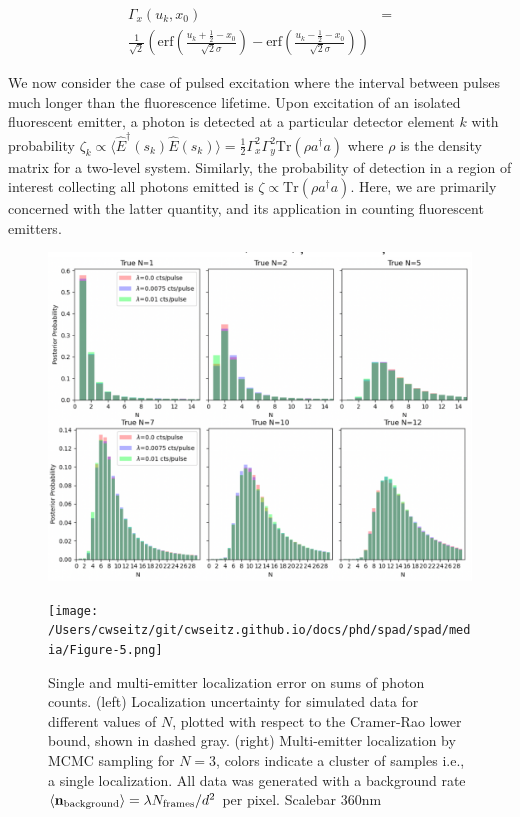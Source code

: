\begin{align*}
\Gamma_{x}(u_k,x_{0}) &= \\ \frac{1}{\sqrt{2}}\left(\mathrm{erf}\left(\frac{u_k+\frac{1}{2}-x_{0}}{\sqrt{2}\sigma}\right) -\mathrm{erf}\left(\frac{u_k-\frac{1}{2}-x_0}{\sqrt{2}\sigma}\right)\right)
\end{align*}

We now consider the case of pulsed excitation where the interval between pulses much longer than the fluorescence lifetime. Upon excitation of an isolated fluorescent emitter, a photon is detected at a particular detector element $k$ with probability $\zeta_k \propto \langle \hat{E}^{\dagger}(s_k)\hat{E}(s_k)\rangle = \frac{1}{2}\Gamma_{x}^2 \Gamma_{y}^2\mathrm{Tr}(\rho a^{\dagger}a)$ where $\rho$ is the density matrix for a two-level system. Similarly, the probability of detection in a region of interest collecting all photons emitted is $\zeta\propto \mathrm{Tr}(\rho a^{\dagger}a)$. Here, we are primarily concerned with the latter quantity, and its application in counting fluorescent emitters.

\begin{figure}[t]
\centering
\includegraphics[width=14cm]{media/PoissonBinomialSims.png}
\caption{}
\end{figure}    


\begin{figure}[t]
\centering
\texttt{[image: /Users/cwseitz/git/cwseitz.github.io/docs/phd/spad/spad/media/Figure-5.png]}
\caption{Single and multi-emitter localization error on sums of photon counts. (left) Localization uncertainty for simulated data for different values of $N$, plotted with respect to the Cramer-Rao lower bound, shown in dashed gray. (right) Multi-emitter localization by MCMC sampling for $N=3$, colors indicate a cluster of samples i.e., a single localization. All data was generated with a background rate $\langle \bold{n}_{\mathrm{background}} \rangle = \lambda N_{\mathrm{frames}}/d^{2}$ per pixel. Scalebar 360nm}
\end{figure}   

